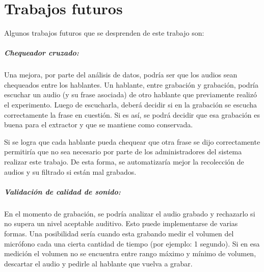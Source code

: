 \chapter{Trabajos futuros}

Algunos trabajos futuros que se desprenden de este trabajo son:



\paragraph*{Chequeador cruzado:} Una mejora, por parte del análisis de datos, podría ser que los audios sean chequeados entre los hablantes. Un hablante, entre grabación y grabación, podría escuchar un audio (y su frase asociada) de otro hablante que previamente realizó el experimento. Luego de escucharla, deberá decidir si en la grabación se escucha correctamente la frase en cuestión. Si es así, se podrá decidir que esa grabación es buena para el extractor y que se mantiene como conservada.

Si se logra que cada hablante pueda chequear que otra frase se dijo correctamente permitiría que no sea necesario por parte de los administradores del sistema realizar este trabajo. De esta forma, se automatizaría mejor la recolección de audios y su filtrado si están mal grabados.

\paragraph*{Validación de calidad de sonido:} En el momento de grabación, se podría analizar el audio grabado y rechazarlo si no supera un nivel aceptable auditivo. Esto puede implementarse de varias formas. Una posibilidad sería cuando esta grabando medir el volumen del micrófono cada una cierta cantidad de tiempo (por ejemplo: 1 segundo). Si en esa medición el volumen no se encuentra entre rango máximo y mínimo de volumen, descartar el audio y pedirle al hablante que vuelva a grabar.

